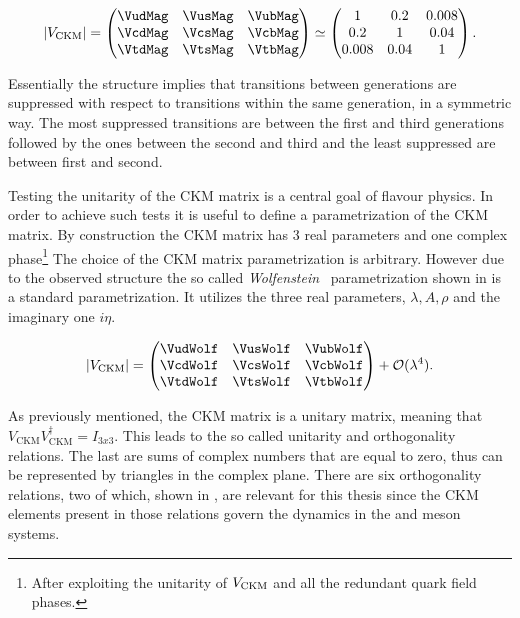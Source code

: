 \begin{equation}
  |V_{\text{CKM}}|
                   = \begin{pmatrix} \VudMag & \VusMag & \VubMag \\ \VcdMag & \VcsMag & \VcbMag \\ \VtdMag & \VtsMag & \VtbMag \end{pmatrix}
              \simeq \begin{pmatrix} 1 & 0.2 & 0.008 \\ 0.2 & 1 & 0.04 \\ 0.008 & 0.04 & 1 \end{pmatrix}.
      \label{CKMmatrix}
  \end{equation}

\noindent Essentially the structure implies that transitions between generations
are suppressed with respect to transitions within the same generation, in a symmetric way. The most suppressed transitions are between
the first and third generations followed by the ones between the second and third and the least suppressed are between first and second.

Testing the unitarity of the CKM matrix is a central goal of flavour physics.
In order to achieve such tests it is useful to define a parametrization of the CKM matrix. By construction the CKM matrix has
3 real parameters and one complex phase\footnote{After exploiting the unitarity of $V_{\rm CKM}$ and all the redundant quark field phases.}
The choice of the CKM matrix parametrization is \aprior arbitrary. However due to the observed structure the so called
{\it Wolfenstein}~\cite{Wolfenstein:1983yz,Buras-wolfenstein} parametrization shown in  is a
standard parametrization. It utilizes the three real parameters, $\lambda,A,\rho$ and the imaginary one $i\eta$.

\begin{equation}
\centering
  |V_{\text{CKM}}|
                   = \begin{pmatrix} \VudWolf & \VusWolf & \VubWolf \\
                                     \VcdWolf & \VcsWolf & \VcbWolf \\
                                     \VtdWolf & \VtsWolf & \VtbWolf \end{pmatrix} + \mathcal{O}(\lambda^4).
      \label{CKMwolfenstein}
\end{equation}

\noindent As previously mentioned, the CKM matrix is a unitary matrix, meaning that $V_{\text{CKM}} V_{\text{CKM}}^\dagger = I_{3x3}$.
This leads to the so called unitarity and orthogonality relations. The last are sums of complex numbers that are equal to zero, thus can be
represented by triangles in the complex plane. There are six orthogonality relations, two of which, shown in , are
relevant for this thesis since the CKM elements present in those relations govern the dynamics in the \Bs and \Bd meson systems.

